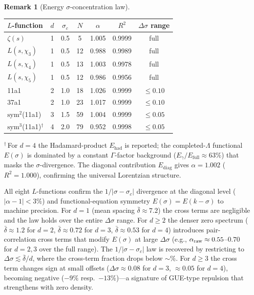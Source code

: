 \documentclass[11pt, a4paper]{article}
\theoremstyle{definition}
\newtheorem{remark}{Remark}[section]
\theoremstyle{plain}
\begin{document}
\begin{remark}[Energy $\sigma$-concentration law]
\smallskip
\begin{center}
\small
\begin{tabular}{@{}lcccccc@{}}
\toprule
$L$-function & $d$ & $\sigma_c$ & $N$ & $\alpha$
  & $R^{2}$ & $\Delta\sigma$ range \\
\midrule
$\zeta(s)$ & 1 & 0.5 & 5 & 1.005 & 0.9999 & full \\
$L(s,\chi_3)$ & 1 & 0.5 & 12 & 0.988 & 0.9989 & full \\
$L(s,\chi_4)$ & 1 & 0.5 & 13 & 1.003 & 0.9978 & full \\
$L(s,\chi_5)$ & 1 & 0.5 & 12 & 0.986 & 0.9956 & full \\
\midrule
11a1              & 2 & 1.0 & 18 & 1.026 & 0.9999 & $\leq 0.10$ \\
37a1              & 2 & 1.0 & 23 & 1.017 & 0.9999 & $\leq 0.10$ \\
\midrule
$\mathrm{sym}^2$(11a1) & 3 & 1.5 & 59 & 1.004 & 0.9999 & $\leq 0.05$ \\
\midrule
$\mathrm{sym}^3$(11a1)${}^\dagger$ & 4 & 2.0 & 79 & 0.952 & 0.9998 & $\leq 0.05$ \\
\bottomrule
\end{tabular}
\end{center}

\noindent
${}^\dagger$\,For $d=4$ the Hadamard-product $E_{\mathrm{had}}$ is reported;
the completed-$\Lambda$ functional $E(\sigma)$ is dominated by a constant
$\Gamma$-factor background ($E_\gamma/E_{\mathrm{full}}\approx 63\%$) that
masks the $\sigma$-divergence.
The diagonal contribution $E_{\mathrm{diag}}$ gives $\alpha=1.002$
($R^2=1.000$), confirming the universal Lorentzian structure.

\smallskip\noindent
All eight $L$-functions confirm the $1/|\sigma-\sigma_c|$ divergence
at the diagonal level ($|\alpha-1|<3\%$) and functional-equation
symmetry $E(\sigma)=E(k-\sigma)$ to machine precision.
For $d=1$ (mean spacing $\bar\delta\approx 7.2$) the cross terms are
negligible and the law holds over the entire $\Delta\sigma$ range.
For $d\geq 2$ the denser zero spectrum ($\bar\delta\approx 1.2$ for $d=2$,
$\bar\delta\approx 0.72$ for $d=3$, $\bar\delta\approx 0.53$ for $d=4$)
introduces pair-correlation cross terms
that modify $E(\sigma)$ at large $\Delta\sigma$ (e.g., $\alpha_{\rm raw}
\approx 0.55$--$0.70$ for $d=2,3$ over the full range).
The $1/|\sigma-\sigma_c|$ law is recovered by restricting to
$\Delta\sigma\lesssim\bar\delta/d$,
where the cross-term fraction drops below $\sim$\%.
For $d\geq 3$ the cross term changes sign at small offsets
($\Delta\sigma\approx 0.08$ for $d=3$, $\approx 0.05$ for $d=4$),
becoming negative ($-9\%$ resp.\ $-13\%$)---a signature of GUE-type
repulsion that strengthens with zero density.


\end{remark}
\end{document}
